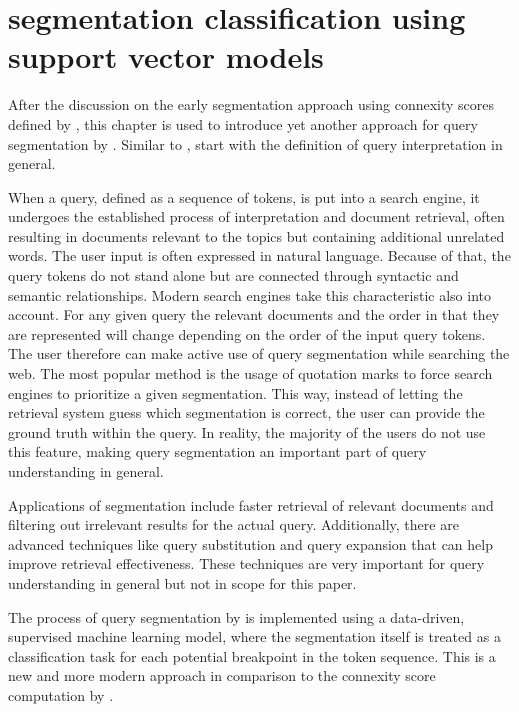 \section{segmentation classification using support vector models} \label{approach2}

After the discussion on the early segmentation approach using connexity scores defined by \citeauthor{Risvik:2003}, this chapter is used to introduce yet another approach for query segmentation by \citeauthor{Bergsma:2007}. Similar to \citeauthor{Risvik:2003}, \citeauthor{Bergsma:2007} start with the definition of query interpretation in general. 

When a query, defined as a sequence of tokens, is put into a search engine, it undergoes the established process of interpretation and document retrieval, often resulting in documents relevant to the topics but containing additional unrelated words. The user input is often expressed in natural language. Because of that, the query tokens do not stand alone but are connected through syntactic and semantic relationships. Modern search engines take this characteristic also into account. For any given query the relevant documents and the order in that they are represented will change depending on the order of the input query tokens. The user therefore can make active use of query segmentation while searching the web. The most popular method is the usage of quotation marks to force search engines to prioritize a given segmentation. This way, instead of letting the retrieval system guess which segmentation is correct, the user can provide the ground truth within the query. In reality, the majority of the users do not use this feature, making query segmentation an important part of query understanding in general. 

Applications of segmentation include faster retrieval of relevant documents and filtering out irrelevant results for the actual query. Additionally, there are advanced techniques like query substitution and query expansion that can help improve retrieval effectiveness. These techniques are very important for query understanding in general but not in scope for this paper. 

The process of query segmentation by \citeauthor{Bergsma:2007} is implemented using a data-driven, supervised machine learning model, where the segmentation itself is treated as a classification task for each potential breakpoint in the token sequence. This is a new and more modern approach in comparison to the connexity score computation by \citet{Risvik:2003}.

